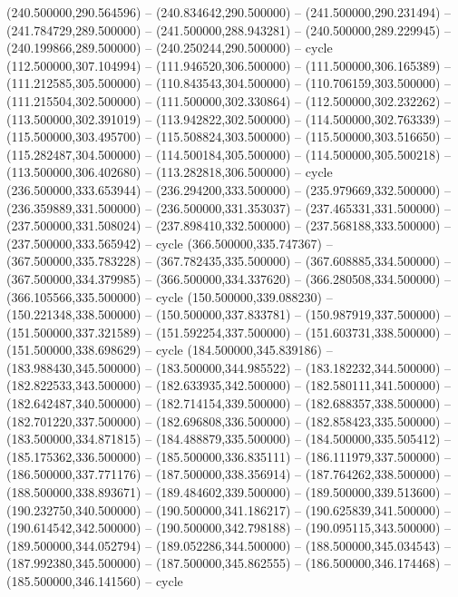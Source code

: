    (240.500000,290.564596) -- (240.834642,290.500000) -- (241.500000,290.231494) -- (241.784729,289.500000) -- (241.500000,288.943281) -- (240.500000,289.229945) -- (240.199866,289.500000) -- (240.250244,290.500000) -- cycle
   (112.500000,307.104994) -- (111.946520,306.500000) -- (111.500000,306.165389) -- (111.212585,305.500000) -- (110.843543,304.500000) -- (110.706159,303.500000) -- (111.215504,302.500000) -- (111.500000,302.330864) -- (112.500000,302.232262) -- (113.500000,302.391019) -- (113.942822,302.500000) -- (114.500000,302.763339) -- (115.500000,303.495700) -- (115.508824,303.500000) -- (115.500000,303.516650) -- (115.282487,304.500000) -- (114.500184,305.500000) -- (114.500000,305.500218) -- (113.500000,306.402680) -- (113.282818,306.500000) -- cycle
   (236.500000,333.653944) -- (236.294200,333.500000) -- (235.979669,332.500000) -- (236.359889,331.500000) -- (236.500000,331.353037) -- (237.465331,331.500000) -- (237.500000,331.508024) -- (237.898410,332.500000) -- (237.568188,333.500000) -- (237.500000,333.565942) -- cycle
   (366.500000,335.747367) -- (367.500000,335.783228) -- (367.782435,335.500000) -- (367.608885,334.500000) -- (367.500000,334.379985) -- (366.500000,334.337620) -- (366.280508,334.500000) -- (366.105566,335.500000) -- cycle
   (150.500000,339.088230) -- (150.221348,338.500000) -- (150.500000,337.833781) -- (150.987919,337.500000) -- (151.500000,337.321589) -- (151.592254,337.500000) -- (151.603731,338.500000) -- (151.500000,338.698629) -- cycle
   (184.500000,345.839186) -- (183.988430,345.500000) -- (183.500000,344.985522) -- (183.182232,344.500000) -- (182.822533,343.500000) -- (182.633935,342.500000) -- (182.580111,341.500000) -- (182.642487,340.500000) -- (182.714154,339.500000) -- (182.688357,338.500000) -- (182.701220,337.500000) -- (182.696808,336.500000) -- (182.858423,335.500000) -- (183.500000,334.871815) -- (184.488879,335.500000) -- (184.500000,335.505412) -- (185.175362,336.500000) -- (185.500000,336.835111) -- (186.111979,337.500000) -- (186.500000,337.771176) -- (187.500000,338.356914) -- (187.764262,338.500000) -- (188.500000,338.893671) -- (189.484602,339.500000) -- (189.500000,339.513600) -- (190.232750,340.500000) -- (190.500000,341.186217) -- (190.625839,341.500000) -- (190.614542,342.500000) -- (190.500000,342.798188) -- (190.095115,343.500000) -- (189.500000,344.052794) -- (189.052286,344.500000) -- (188.500000,345.034543) -- (187.992380,345.500000) -- (187.500000,345.862555) -- (186.500000,346.174468) -- (185.500000,346.141560) -- cycle
